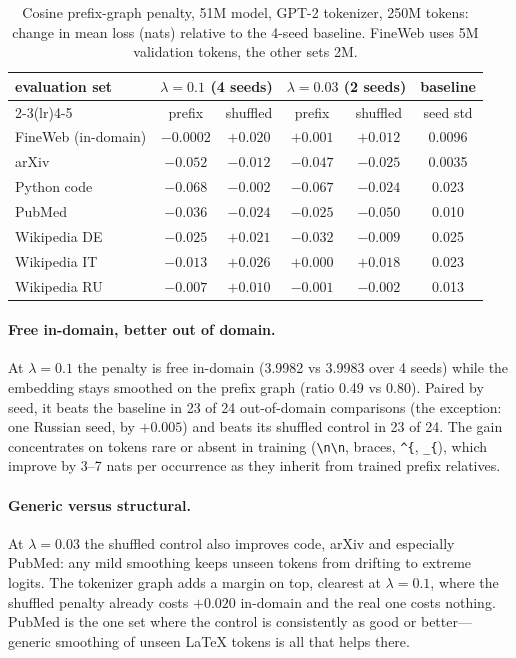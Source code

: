 \documentclass[11pt]{article}
\newcommand{\tok}[1]{\texttt{#1}}          %
\newcommand{\better}[1]{{\boldmath #1}}
\begin{document}
\begin{table}[t]
\centering
\small
\begin{tabular}{lccccc}
\toprule
evaluation set & \multicolumn{2}{c}{$\lambda=0.1$ (4 seeds)} & \multicolumn{2}{c}{$\lambda=0.03$ (2 seeds)} & baseline \\
\cmidrule(lr){2-3}\cmidrule(lr){4-5}
 & prefix & shuffled & prefix & shuffled & seed std \\
\midrule
FineWeb (in-domain) & \better{$-0.0002$} & $+0.020$ & $+0.001$ & $+0.012$ & 0.0096 \\
arXiv               & \better{$-0.052$}  & $-0.012$ & $-0.047$ & $-0.025$ & 0.0035 \\
Python code         & \better{$-0.068$}  & $-0.002$ & $-0.067$ & $-0.024$ & 0.023 \\
PubMed              & \better{$-0.036$}  & $-0.024$ & $-0.025$ & $-0.050$ & 0.010 \\
Wikipedia DE        & \better{$-0.025$}  & $+0.021$ & $-0.032$ & $-0.009$ & 0.025 \\
Wikipedia IT        & \better{$-0.013$}  & $+0.026$ & $+0.000$ & $+0.018$ & 0.023 \\
Wikipedia RU        & \better{$-0.007$}  & $+0.010$ & $-0.001$ & $-0.002$ & 0.013 \\
\bottomrule
\end{tabular}
\caption{Cosine prefix-graph penalty, 51M model, GPT-2 tokenizer, 250M tokens:
change in mean loss (nats) relative to the 4-seed baseline. FineWeb uses 5M
validation tokens, the other sets 2M.}
\label{tab:cosine}
\end{table}

\paragraph{Free in-domain, better out of domain.} At $\lambda=0.1$ the penalty is
free in-domain (3.9982 vs 3.9983 over 4 seeds) while the embedding stays smoothed on
the prefix graph (ratio 0.49 vs 0.80). Paired by seed, it beats the baseline in 23
of 24 out-of-domain comparisons (the exception: one Russian seed, by $+0.005$) and
beats its shuffled control in 23 of 24. The gain concentrates on tokens rare or
absent in training (\tok{\textbackslash n\textbackslash n}, braces, \tok{\^{}\{},
\tok{\_\{}), which improve by 3--7 nats per occurrence as they inherit from trained
prefix relatives.

\paragraph{Generic versus structural.} At $\lambda=0.03$ the shuffled control also
improves code, arXiv and especially PubMed: any mild smoothing keeps unseen tokens
from drifting to extreme logits. The tokenizer graph adds a margin on top, clearest at
$\lambda=0.1$, where the shuffled penalty already costs $+0.020$ in-domain and the
real one costs nothing. PubMed is the one set where the control is consistently as
good or better---generic smoothing of unseen \LaTeX{} tokens is all that helps there.
\end{document}
